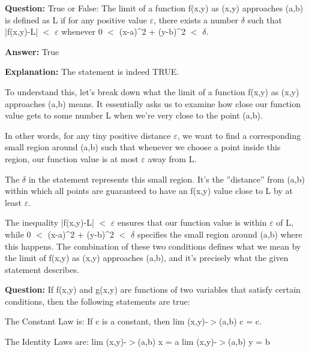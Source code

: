 \documentclass{article}
\begin{document}
                \vspace{0.5cm} 
        
            
                \textbf {Question:} True or False: The limit of a function f(x,y) as (x,y) approaches (a,b) is defined as L if for any positive value \ensuremath{\varepsilon}, there exists a number \ensuremath{\delta} such that |f(x,y)-L| \ensuremath{<} \ensuremath{\varepsilon} whenever 0 \ensuremath{<} (x-a){\textasciicircum}2 + (y-b){\textasciicircum}2 \ensuremath{<} \ensuremath{\delta}.
                
                \textbf{Answer:} True

                \textbf{Explanation:} The statement is indeed TRUE.

To understand this, let's break down what the limit of a function f(x,y) as (x,y) approaches (a,b) means. It essentially asks us to examine how close our function value gets to some number L when we're very close to the point (a,b).

In other words, for any tiny positive distance \ensuremath{\varepsilon}, we want to find a corresponding small region around (a,b) such that whenever we choose a point inside this region, our function value is at most \ensuremath{\varepsilon} away from L.

The \ensuremath{\delta} in the statement represents this small region. It's the ''distance'' from (a,b) within which all points are guaranteed to have an f(x,y) value close to L by at least \ensuremath{\varepsilon}.

The inequality |f(x,y)-L| \ensuremath{<} \ensuremath{\varepsilon} ensures that our function value is within \ensuremath{\varepsilon} of L, while 0 \ensuremath{<} (x-a){\textasciicircum}2 + (y-b){\textasciicircum}2 \ensuremath{<} \ensuremath{\delta} specifies the small region around (a,b) where this happens. The combination of these two conditions defines what we mean by the limit of f(x,y) as (x,y) approaches (a,b), and it's precisely what the given statement describes.
                
                \vspace{0.5cm} 
        
            
                \textbf {Question:} If f(x,y) and g(x,y) are functions of two variables that satisfy certain conditions, then the following statements are true:

The Constant Law is: If c is a constant, then lim (x,y)-\ensuremath{>}(a,b) c = c.

The Identity Laws are:
lim (x,y)-\ensuremath{>}(a,b) x = a
lim (x,y)-\ensuremath{>}(a,b) y = b
\end{document}
